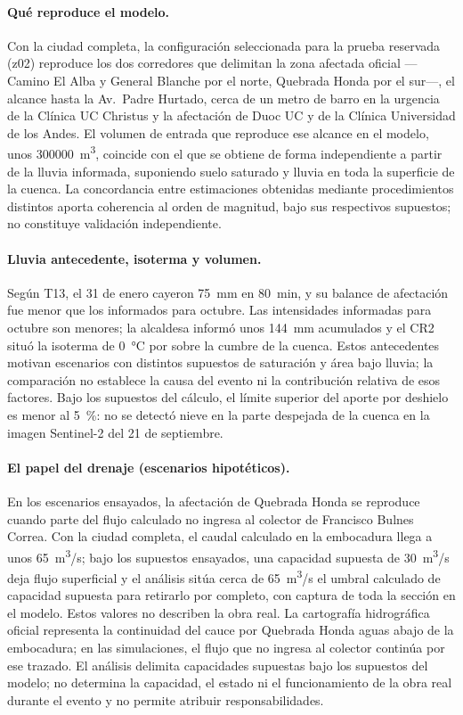 \paragraph{Qué reproduce el modelo.} Con la ciudad completa, la configuración seleccionada para la prueba reservada (z02) reproduce los dos corredores que delimitan la zona afectada oficial ---Camino El Alba y General Blanche por el norte, Quebrada Honda por el sur---, el alcance hasta la Av.\ Padre Hurtado, cerca de un metro de barro en la urgencia de la Clínica UC Christus y la afectación de Duoc UC y de la Clínica Universidad de los Andes. El volumen de entrada que reproduce ese alcance en el modelo, unos \SI{300000}{m^3}, coincide con el que se obtiene de forma independiente a partir de la lluvia informada, suponiendo suelo saturado y lluvia en toda la superficie de la cuenca. La concordancia entre estimaciones obtenidas mediante procedimientos distintos aporta coherencia al orden de magnitud, bajo sus respectivos supuestos; no constituye validación independiente.

\paragraph{Lluvia antecedente, isoterma y volumen.} Según T13, el 31 de enero cayeron \SI{75}{mm} en \SI{80}{min}, y su balance de afectación fue menor que los informados para octubre. Las intensidades informadas para octubre son menores; la alcaldesa informó unos \SI{144}{mm} acumulados y el CR2 situó la isoterma de \SI{0}{\celsius} por sobre la cumbre de la cuenca. Estos antecedentes motivan escenarios con distintos supuestos de saturación y área bajo lluvia; la comparación no establece la causa del evento ni la contribución relativa de esos factores. Bajo los supuestos del cálculo, el límite superior del aporte por deshielo es menor al \SI{5}{\percent}: no se detectó nieve en la parte despejada de la cuenca en la imagen Sentinel-2 del 21 de septiembre.

\paragraph{El papel del drenaje (escenarios hipotéticos).} En los escenarios ensayados, la afectación de Quebrada Honda se reproduce cuando parte del flujo calculado no ingresa al colector de Francisco Bulnes Correa. Con la ciudad completa, el caudal calculado en la embocadura llega a unos \SI{65}{m^3/s}; bajo los supuestos ensayados, una capacidad supuesta de \SI{30}{m^3/s} deja flujo superficial y el análisis sitúa cerca de \SI{65}{m^3/s} el umbral calculado de capacidad supuesta para retirarlo por completo, con captura de toda la sección en el modelo. Estos valores no describen la obra real. La cartografía hidrográfica oficial representa la continuidad del cauce por Quebrada Honda aguas abajo de la embocadura; en las simulaciones, el flujo que no ingresa al colector continúa por ese trazado. El análisis delimita capacidades supuestas bajo los supuestos del modelo; no determina la capacidad, el estado ni el funcionamiento de la obra real durante el evento y no permite atribuir responsabilidades.

